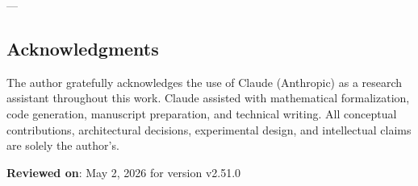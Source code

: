 ---
\subsection{Acknow\-ledgments}

The author gratefully ackno\-wledges the use of Claude (Anthropic) as a research assistant throughout this work. Claude assisted with mathe\-matical forma\-lization, code generation, manuscript preparation, and technical writing. All conceptual contr\-ibutions, archi\-tectural decisions, exper\-imental design, and intel\-lectual claims are solely the author's.

\textbf{Reviewed on}: May 2, 2026 for version v2.51.0
